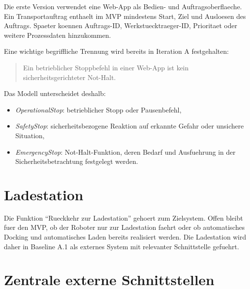 Die erste Version verwendet eine Web-App als Bedien- und Auftragsoberflaeche. Ein Transportauftrag enthaelt im MVP mindestens Start, Ziel und Ausloesen des Auftrags. Spaeter koennen Auftrags-ID, Werkstuecktraeger-ID, Prioritaet oder weitere Prozessdaten hinzukommen.

Eine wichtige begriffliche Trennung wird bereits in Iteration A festgehalten:
\begin{quote}
Ein betrieblicher Stoppbefehl in einer Web-App ist kein sicherheitsgerichteter Not-Halt.
\end{quote}

Das Modell unterscheidet deshalb:
\begin{itemize}
  \item \emph{OperationalStop}: betrieblicher Stopp oder Pausenbefehl,
  \item \emph{SafetyStop}: sicherheitsbezogene Reaktion auf erkannte Gefahr oder unsichere Situation,
  \item \emph{EmergencyStop}: Not-Halt-Funktion, deren Bedarf und Ausfuehrung in der Sicherheitsbetrachtung festgelegt werden.
\end{itemize}

\section{Ladestation}

Die Funktion \enquote{Rueckkehr zur Ladestation} gehoert zum Zielsystem. Offen bleibt fuer den MVP, ob der Roboter nur zur Ladestation faehrt oder ob automatisches Docking und automatisches Laden bereits realisiert werden. Die Ladestation wird daher in Baseline A.1 als externes System mit relevanter Schnittstelle gefuehrt.

\section{Zentrale externe Schnittstellen}
\label{sec:interfaces}

